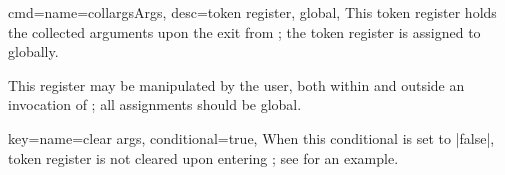 \documentclass[a4paper,11pt]{article}
\begin{document}
\begin{doc}[%
    pi=\docaux{cmd}{collargsReturn}
  ]
\begin{itemize}
  \end{itemize}
\end{doc}

\begin{doc}{
    cmd={name=collargsArgs, desc={token register, global}},
  }
  This token register holds the collected arguments upon the exit from
  ; the token register is assigned to globally.

  This register may be manipulated by the user, both within and outside an
  invocation of ; all assignments should be global.
\end{doc}

\begin{doc}[
    pi=\docaux{cmd}{ifcollargsClearArgs}
  ]{
    key={name=clear args, conditional=true},
  }
  When this conditional is set to |false|, token register 
  is not cleared upon entering ; see
   for an example.
\end{doc}
\end{document}
